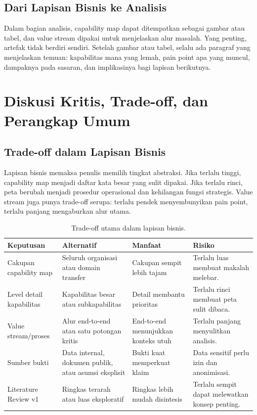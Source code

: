 \subsection{Dari Lapisan Bisnis ke Analisis}

Dalam bagian analisis, capability map dapat ditempatkan sebagai gambar atau
tabel, dan value stream dipakai untuk menjelaskan alur masalah. Yang penting,
artefak tidak berdiri sendiri. Setelah gambar atau tabel, selalu ada paragraf
yang menjelaskan temuan: kapabilitas mana yang lemah, pain point apa yang
muncul, dampaknya pada sasaran, dan implikasinya bagi lapisan berikutnya.

\section{Diskusi Kritis, Trade-off, dan Perangkap Umum}

\subsection{Trade-off dalam Lapisan Bisnis}

Lapisan bisnis memaksa penulis memilih tingkat abstraksi. Jika terlalu tinggi,
capability map menjadi daftar kata besar yang sulit dipakai. Jika terlalu rinci,
peta berubah menjadi prosedur operasional dan kehilangan fungsi strategis. Value
stream juga punya trade-off serupa: terlalu pendek menyembunyikan pain point,
terlalu panjang mengaburkan alur utama.

\begin{table}[htbp]
\centering
\scriptsize
\caption{Trade-off utama dalam lapisan bisnis.}
\label{tab:tradeoff-bab4}
\begin{tabularx}{\textwidth}{@{}p{} X X X@{}}
\hline
\textbf{Keputusan} & \textbf{Alternatif} & \textbf{Manfaat} & \textbf{Risiko} \\
\hline
Cakupan capability map & Seluruh organisasi atau domain transfer & Cakupan
sempit lebih tajam & Terlalu luas membuat makalah melebar. \\
Level detail kapabilitas & Kapabilitas besar atau subkapabilitas & Detail
membantu prioritas & Terlalu rinci membuat peta sulit dibaca. \\
Value stream/proses & Alur end-to-end atau satu potongan kritis & End-to-end
menunjukkan konteks utuh & Terlalu panjang menyulitkan analisis. \\
Sumber bukti & Data internal, dokumen publik, atau asumsi eksplisit & Bukti kuat
memperkuat klaim & Data sensitif perlu izin dan anonimisasi. \\
Literature Review v1 & Ringkas terarah atau luas eksploratif & Ringkas lebih
mudah disintesis & Terlalu sempit dapat melewatkan konsep penting. \\
\hline
\end{tabularx}
\end{table}

